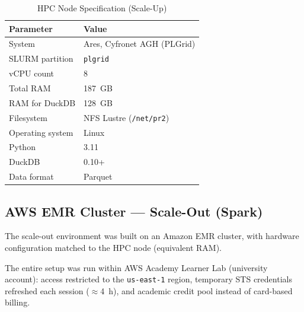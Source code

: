\documentclass[12pt,a4paper]{article}
\begin{document}
\begin{table}[H]
  \caption{HPC Node Specification (Scale-Up)}
  \label{tab:hpc-spec}
  \begin{tabular}{ll}
    \toprule
    \textbf{Parameter} & \textbf{Value} \\
    \midrule
    System              & Ares, Cyfronet AGH (PLGrid) \\
    SLURM partition     & \texttt{plgrid} \\
    vCPU count          & 8 \\
    Total RAM           & 187~GB \\
    RAM for DuckDB      & 128~GB \\
    Filesystem          & NFS Lustre (\texttt{/net/pr2}) \\
    Operating system    & Linux \\
    Python              & 3.11 \\
    DuckDB              & 0.10+ \\
    Data format         & Parquet \\
    \bottomrule
  \end{tabular}
\end{table}

\subsection{AWS EMR Cluster --- Scale-Out (Spark)}

The scale-out environment was built on an Amazon EMR cluster, with hardware
configuration matched to the HPC node (equivalent RAM).

The entire setup was run within AWS Academy Learner Lab (university account):
access restricted to the \texttt{us-east-1} region, temporary STS credentials
refreshed each session ($\approx$4~h), and academic credit pool instead of
card-based billing.
\end{document}

